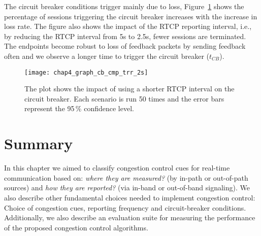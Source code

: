 The circuit breaker conditions trigger mainly due to loss,
Figure~\ref{fig:short-rtcp} shows the percentage of sessions triggering the
circuit breaker increases with the increase in loss rate. The figure also
shows the impact of the RTCP reporting interval, i.e., by reducing the RTCP
interval from 5s to 2.5s, fewer sessions are terminated. The endpoints become
robust to loss of feedback packets by sending feedback often and we observe a
longer time to trigger the circuit breaker ($t_{CB}$).

\begin{figure}[!t]
  \centerline{
    {\texttt{[image: chap4\_graph\_cb\_cmp\_trr\_2s]}}
  }
  \caption{The plot shows the impact of using a shorter RTCP interval on the
  circuit breaker. Each scenario is run 50 times and the error bars represent
  the 95\,\% confidence level.}
  \label{fig:short-rtcp}
\end{figure}

\section{Summary}

In this chapter we aimed to classify congestion control cues for real-time
communication based on: \emph{where they are measured?} (by in-path or 
out-of-path sources) and \emph{how they are reported?} (via in-band or out-of-band
signaling). We also describe other fundamental choices needed to implement 
congestion control: Choice of congestion cues, reporting frequency and 
circuit-breaker conditions. Additionally, we also describe an evaluation
suite for measuring the performance of the proposed congestion control
algorithms.
